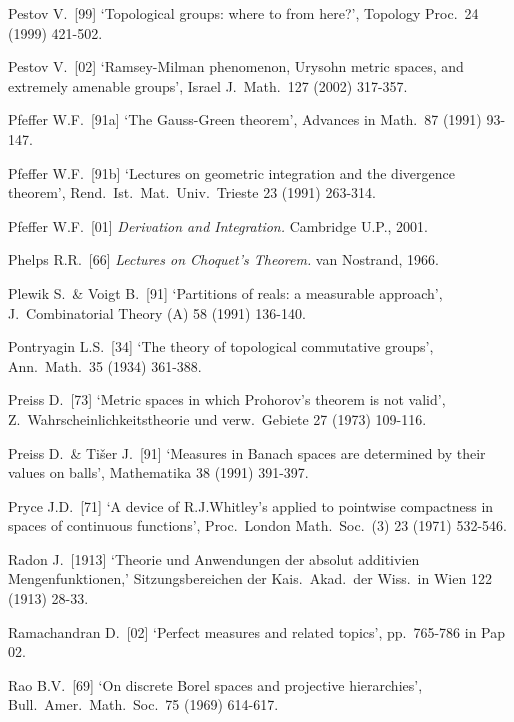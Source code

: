 {Pestov V.\ [99] `Topological groups:  where to from here?',
Topology Proc.\ 24 (1999) 421-502.
\cmmnt{[\S493 {\it notes\/}.]}

Pestov V.\ [02] `Ramsey-Milman phenomenon, Urysohn metric spaces,
and extremely amenable groups', Israel J.\ Math.\ 127 (2002) 317-357.
\cmmnt{[493E, 493Ya, \S493 {\it notes\/}.]}

Pfeffer W.F.\ [91a] `The Gauss-Green theorem', Advances in Math.\ 87
(1991) 93-147.
\cmmnt{[484Xb.]}

Pfeffer W.F.\ [91b] `Lectures on geometric integration and the
divergence theorem', Rend.\ Ist.\ Mat.\ Univ.\ Trieste 23 (1991)
263-314.
\cmmnt{[484B.]}

Pfeffer W.F.\ [01] {\it Derivation and Integration.}  Cambridge U.P.,
2001.
\cmmnt{[\S484 {\it notes\/}.]}

Phelps R.R.\ [66] {\it Lectures on Choquet's Theorem.}  van Nostrand,
1966.
\cmmnt{[\S461 {\it notes\/}.]}

Plewik S.\ \& Voigt B.\ [91] `Partitions of reals:  a measurable approach',
J.\ Combinatorial Theory (A) 58 (1991) 136-140.
\cmmnt{[443Yl.]}

Pontryagin L.S.\ [34] `The theory of topological commutative groups',
Ann.\ Math.\ 35 (1934) 361-388.
\cmmnt{[445U.]}

Preiss D.\ [73] `Metric spaces in which Prohorov's theorem is not valid', Z.\ Wahrscheinlichkeitstheorie und verw.\ Gebiete 27 (1973) 109-116.
\cmmnt{[439S.]}

Preiss D.\ \& Ti\v{s}er J.\ [91]
`Measures in Banach spaces are determined by their values on balls',
Mathematika 38 (1991) 391-397.
\cmmnt{[\S466 {\it notes\/}.]}

Pryce J.D.\ [71] `A device of R.J.Whitley's applied to pointwise
compactness in spaces of continuous functions', Proc.\ London Math.\
Soc.\ (3) 23 (1971) 532-546.
\cmmnt{[462B, 462C.]}

\medskip%

Radon J.\ [1913] `Theorie und Anwendungen der absolut additivien
Mengenfunktionen,' Sitzungsbereichen der Kais.\ Akad.\ der Wiss.\ in
Wien 122 (1913) 28-33.
\cmmnt{[\S416 {\it notes\/}.]}

Ramachandran D.\ [02] `Perfect measures and related topics', pp.\
765-786 in {\smc Pap 02}.
\cmmnt{[\S451 {\it notes\/}.]}

Rao B.V.\ [69] `On discrete Borel spaces and projective hierarchies',
Bull.\ Amer.\ Math.\ Soc.\ 75 (1969) 614-617.
\cmmnt{[419F.]}

}

